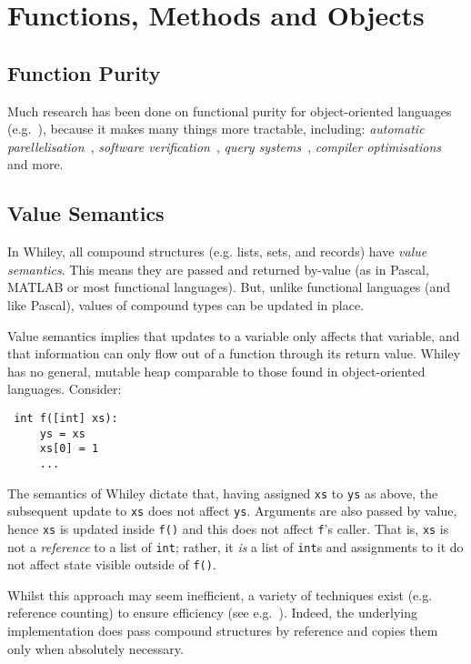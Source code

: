 \newpage
\section{Functions, Methods and Objects}



\subsection{Function Purity}
Much research has been done on functional purity for object-oriented
languages (e.g.~\cite{Pea11,Rou04,SR05,MRR02}), because it makes 
many things more tractable, including: {\em automatic
 parellelisation}~\cite{ABCR10,CRPAHBW10}, {\em software
 verification}~\cite{Leav02,BNSS04,BA05,DL07}, {\em query
 systems}~\cite{LHS97,WPN08}, {\em compiler
 optimisations}~\cite{Cla97,LLH05,ZRKW08} and more.

\subsection{Value Semantics}
\label{value_semantics}
In Whiley, all compound structures (e.g. lists, sets, and records)
have {\em value semantics}.  This means they are passed and returned
by-value (as in Pascal, MATLAB or most functional languages).  But, unlike
functional languages (and like Pascal), values of compound types can
be updated in place.

Value semantics implies that updates to a variable only affects that
variable, and that information can only flow out of a function through
its return value.  Whiley has no general, mutable heap comparable to
those found in object-oriented languages.  Consider:
\begin{lstlisting}
 int f([int] xs):
     ys = xs
     xs[0] = 1
     ...
\end{lstlisting}
The semantics of Whiley dictate that, having assigned \lstinline{xs}
to \lstinline{ys} as above, the subsequent update to \lstinline{xs}
does not affect \lstinline{ys}.  Arguments are also passed by value,
hence \lstinline{xs} is updated inside \lstinline{f()} and this does
not affect \lstinline{f}'s caller.  That is, \lstinline{xs} is not a
{\em reference} to a list of \lstinline{int}; rather, it {\em is} a
list of \lstinline{int}s and assignments to it do not affect state
visible outside of \lstinline{f()}. 

Whilst this approach may seem inefficient, a variety of techniques
exist (e.g. reference counting) to ensure efficiency (see
e.g.~\cite{LH11,Shank01,Ode91}).  Indeed, the underlying
implementation does pass compound structures by reference and copies
them only when absolutely necessary.

